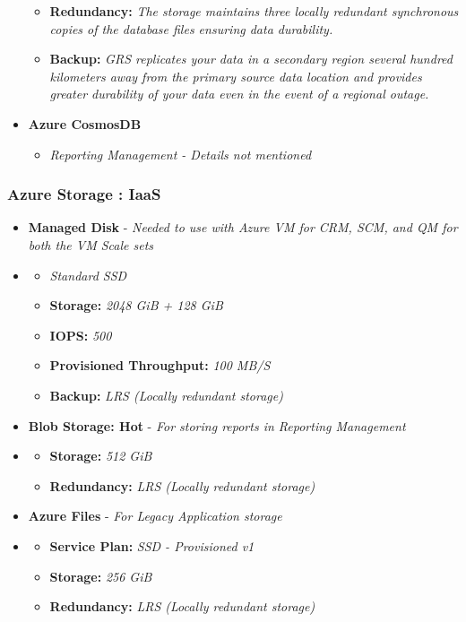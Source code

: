 \documentclass{llncs}
\begin{document}
\begin{itemize}
\begin{itemize}
              \item  \textbf{Redundancy:} \textit{The storage maintains three locally redundant synchronous copies of the database files ensuring data durability.}
              \item  \textbf{Backup:} \textit{GRS replicates your data in a secondary region several hundred kilometers away from the primary source data location and provides greater durability of your data even in the event of a regional outage.}
          \end{itemize}
    \item \textbf{Azure CosmosDB}
          \begin{itemize}
              \item \textit{Reporting Management - Details not mentioned}

          \end{itemize}
\end{itemize}

\subsubsection{Azure Storage : IaaS} \leavevmode\newline
\begin{itemize}
    \item \textbf{Managed Disk} - \textit{Needed to use with Azure VM for CRM, SCM, and QM for both the VM Scale sets}
    \item \begin{itemize}
              \item \textit{Standard SSD}
              \item  \textbf{Storage:} \textit{2048 GiB + 128 GiB}
              \item  \textbf{IOPS:} \textit{500}
              \item  \textbf{Provisioned Throughput:} \textit{100 MB/S}
              \item  \textbf{Backup:} \textit{LRS (Locally redundant storage)}
          \end{itemize}
    \item \textbf{Blob Storage: Hot} - \textit{For storing reports in Reporting Management}
    \item \begin{itemize}
              \item  \textbf{Storage:} \textit{512 GiB}
              \item  \textbf{Redundancy:} \textit{LRS (Locally redundant storage)}
          \end{itemize}
    \item \textbf{Azure Files} - \textit{For Legacy Application storage}
    \item \begin{itemize}
              \item  \textbf{Service Plan:} \textit{SSD - Provisioned v1}
              \item  \textbf{Storage:} \textit{256 GiB}
              \item  \textbf{Redundancy:} \textit{LRS (Locally redundant storage)}
          \end{itemize}
\end{itemize}
\end{document}
